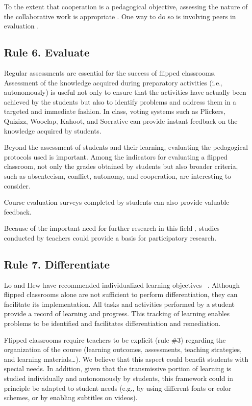 \documentclass[10pt,letterpaper]{article}
\begin{document}
To the extent that cooperation is a pedagogical objective, assessing the nature of the collaborative work is appropriate \cite{lebrun_vers_2016}. One way to do so is involving peers in evaluation \cite{lopez}.


\subsection{Rule 6. Evaluate}

Regular assessments are essential for the success of flipped classrooms. Assessment of the knowledge acquired during preparatory activities (i.e., autonomously) is useful not only to ensure that the activities have actually been achieved by the students but also to identify problems and address them in a targeted and immediate fashion. 
In class, voting systems such as Plickers, Quizizz, Wooclap, Kahoot, and Socrative can provide instant feedback on the knowledge acquired by students.

Beyond the assessment of students and their learning, evaluating the pedagogical protocols used is important. 
Among the indicators for evaluating a flipped classroom, not only the grades obtained by students but also broader criteria, such as absenteeism, conflict, autonomy, and cooperation, are interesting to consider.

Course evaluation surveys completed by students can also provide valuable feedback.

Because of the important need for further research in this field \cite{abeysekera_motivation_2015,bishop_flipped_2013,lo_critical_2017}, studies conducted by teachers could provide a basis for participatory research.

\subsection{Rule 7. Differentiate}

Lo and Hew have recommended individualized learning objectives ~\cite{lo_critical_2017}. Although flipped classrooms alone are not sufficient to perform differentiation, they can facilitate its implementation. All tasks and activities performed by a student provide a record of learning and progress. This tracking of learning enables problems to be identified and facilitates differentiation and remediation.

Flipped classrooms require teachers to be explicit (rule \#3) regarding the organization of the course (learning outcomes, assessments, teaching strategies, and learning materials\ldots). We believe that this aspect could benefit students with special needs. 
In addition, given that the transmissive portion of learning is studied individually and autonomously by students, this framework could in principle be adapted to student needs (e.g., by using different fonts or color schemes, or by enabling subtitles on videos).
\end{document}

